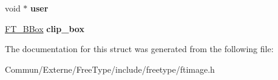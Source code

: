 \begin{DoxyCompactItemize}
\item 
void $\ast$ {\bfseries user}\hypertarget{struct_f_t___raster___params___af78bac59f93c989840bbcbcbefd77c55}{}\label{struct_f_t___raster___params___af78bac59f93c989840bbcbcbefd77c55}

\item 
\hyperlink{struct_f_t___b_box__}{F\+T\+\_\+\+B\+Box} {\bfseries clip\+\_\+box}\hypertarget{struct_f_t___raster___params___ab32f75f19d9cacb20e410886c055e306}{}\label{struct_f_t___raster___params___ab32f75f19d9cacb20e410886c055e306}

\end{DoxyCompactItemize}


The documentation for this struct was generated from the following file\+:\begin{DoxyCompactItemize}
\item 
Commun/\+Externe/\+Free\+Type/include/freetype/ftimage.\+h\end{DoxyCompactItemize}
